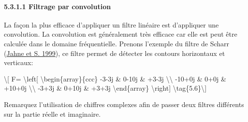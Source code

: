 \documentclass[
]{article}
\begin{document}
\paragraph{\texorpdfstring{{5.3.1.1} Filtrage par
convolution}{5.3.1.1 Filtrage par convolution}}\label{filtrage-par-convolution}

La façon la plus efficace d'appliquer un filtre linéaire est d'appliquer
une convolution. La convolution est généralement très efficace car elle
est peut être calculée dans le domaine fréquentielle. Prenons l'exemple
du filtre de Scharr {(\href{references.html\#ref-Scharr1999}{Jahne et S.
1999})}, ce filtre permet de détecter les contours horizontaux et
verticaux:

\label{eq-scharr-filter}{{\textbackslash{[} F=
\textbackslash left{[} \textbackslash begin\{array\}\{ccc\} -3-3j \&
0-10j \& +3-3j \textbackslash\textbackslash{} -10+0j \& 0+0j \& +10+0j
\textbackslash\textbackslash{} -3+3j \& 0+10j \& +3+3j
\textbackslash end\{array\} \textbackslash right{]}
\textbackslash tag\{5.6\}\textbackslash{]}}}

Remarquez l'utilisation de chiffres complexes afin de passer deux
filtres différents sur la partie réelle et imaginaire.
\end{document}
